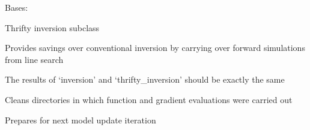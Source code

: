 \documentclass[letterpaper,10pt,english]{sphinxmanual}
\begin{document}
\begin{fulllineitems}
\label{\detokenize{ref/seisflows.workflow:seisflows.workflow.thrifty_inversion.thrifty_inversion}}
Bases: {\hyperref[\detokenize{ref/seisflows.workflow:seisflows.workflow.inversion.inversion}]{}}

Thrifty inversion subclass

Provides savings over conventional inversion by carrying over forward
simulations from line search

The results of ‘inversion’ and ‘thrifty\_inversion’ should be exactly the
same

\begin{fulllineitems}
\label{\detokenize{ref/seisflows.workflow:seisflows.workflow.thrifty_inversion.thrifty_inversion.clean}}
Cleans directories in which function and gradient evaluations were
carried out

\end{fulllineitems}


\begin{fulllineitems}
\label{\detokenize{ref/seisflows.workflow:seisflows.workflow.thrifty_inversion.thrifty_inversion.initialize}}
Prepares for next model update iteration

\end{fulllineitems}


\begin{fulllineitems}
\label{\detokenize{ref/seisflows.workflow:seisflows.workflow.thrifty_inversion.thrifty_inversion.status}}
\end{fulllineitems}


\end{fulllineitems}
\end{document}
